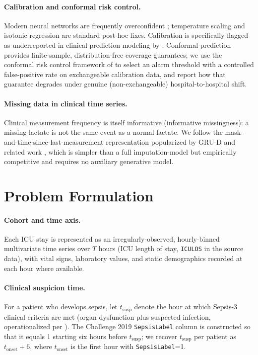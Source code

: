 \documentclass[11pt]{article}
\begin{document}
\paragraph{Calibration and conformal risk control.} Modern neural networks are frequently overconfident \citep{guo2017calibration}; temperature scaling \citep{guo2017calibration} and isotonic regression \citep{platt1999probabilistic} are standard post-hoc fixes. Calibration is specifically flagged as underreported in clinical prediction modeling by \citet{vancalster2019calibration}. Conformal prediction \citep{vovk2005algorithmic, angelopoulos2021gentle} provides finite-sample, distribution-free coverage guarantees; we use the conformal risk control framework of \citet{angelopoulos2022conformal} to select an alarm threshold with a controlled false-positive rate on exchangeable calibration data, and report how that guarantee degrades under genuine (non-exchangeable) hospital-to-hospital shift.

\paragraph{Missing data in clinical time series.} Clinical measurement frequency is itself informative (informative missingness): a missing lactate is not the same event as a normal lactate. We follow the mask-and-time-since-last-measurement representation popularized by GRU-D and related work \citep{che2018recurrent}, which is simpler than a full imputation-model but empirically competitive and requires no auxiliary generative model.

\section{Problem Formulation}
\label{sec:formulation}

\paragraph{Cohort and time axis.} Each ICU stay is represented as an irregularly-observed, hourly-binned multivariate time series over $T$ hours (ICU length of stay, \texttt{ICULOS} in the source data), with vital signs, laboratory values, and static demographics recorded at each hour where available.

\paragraph{Clinical suspicion time.} For a patient who develops sepsis, let $t_{\text{susp}}$ denote the hour at which Sepsis-3 clinical criteria are met (organ dysfunction plus suspected infection, operationalized per \citet{singer2016sepsis3, seymour2016clinical}). The Challenge 2019 \texttt{SepsisLabel} column is constructed so that it equals 1 starting six hours before $t_{\text{susp}}$; we recover $t_{\text{susp}}$ per patient as $t_{\text{onset}} + 6$, where $t_{\text{onset}}$ is the first hour with \texttt{SepsisLabel}=1.
\end{document}
